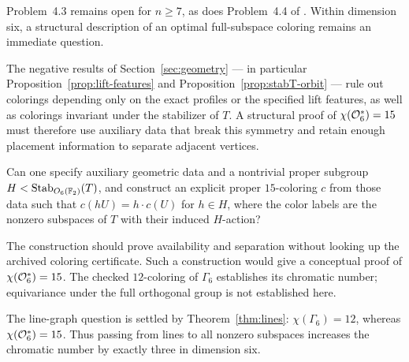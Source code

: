 Problem~4.3 remains open for \(n\geq7\), as does Problem~4.4 of
\cite{Nikandish2026}.  Within dimension six, a structural description
of an optimal full-subspace coloring remains an immediate question.

The negative results of Section~\ref{sec:geometry} --- in particular
Proposition~\ref{prop:lift-features} and
Proposition~\ref{prop:stabT-orbit} --- rule out colorings depending
only on the exact profiles or the specified lift features, as well as
colorings invariant under the stabilizer of \(T\).
A structural proof of
\(\chi(\mathcal O_6^*)=15\) must therefore use auxiliary data that break
this symmetry and retain enough placement information to separate
adjacent vertices.

\begin{problem}\label{prob:structural}
Can one specify auxiliary geometric data and a nontrivial proper subgroup
\(H<\operatorname{Stab}_{O_6(\mathbb F_2)}(T)\), and construct an explicit proper
\(15\)-coloring \(c\) from those data such that
\(c(hU)=h\cdot c(U)\) for \(h\in H\), where the color labels are the
nonzero subspaces of \(T\) with their induced \(H\)-action?

The construction should prove availability and separation without
looking up the archived coloring certificate. Such a construction would
give a conceptual proof of \(\chi(\mathcal O_6^*)=15\).
The checked \(12\)-coloring of \(\Gamma_6\) establishes its chromatic number;
equivariance under the full orthogonal group is not established here.
\end{problem}

\begin{remark}\label{prob:gamma-six}
The line-graph question is settled by Theorem~\ref{thm:lines}:
\(\chi(\Gamma_6)=12\), whereas \(\chi(\mathcal O_6^*)=15\).
Thus passing from lines to all nonzero subspaces increases the
chromatic number by exactly three in dimension six.
\end{remark}

